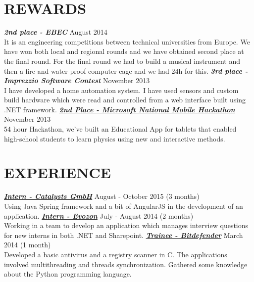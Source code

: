 \documentclass[line,margin]{res}
\begin{document}
\begin{resume}
\section{\color{section} REWARDS} 
\justify
{\color{headings}\large \sl \textbf{2nd place - EBEC}} {\scriptsize August 2014} \\
It is an engineering competitions between technical universities from Europe. We have won both local and regional rounds and we have obtained second place at the final round. 
For the final round we had to build a musical instrument and then a fire and water proof computer cage and we had 24h for this.
\vspace{0.2cm}
\newline
{\color{headings}\large \sl \textbf{3rd place - Imprezzio Software Contest}} {\scriptsize November 2013} \\
I have developed a home automation system. I have used sensors and custom build hardware which were read and controlled from a web interface built using .NET framework.
\vspace{0.2cm}
\newline
{\color{headings}\large \sl \textbf{\href{https://github.com/AlexBondor/TurnMeOff-Web}{2nd Place - Microsoft National Mobile Hackathon}}} {\scriptsize November 2013} \\
54 hour Hackathon, we've built an Educational App for tablets that enabled high-school students to learn physics using new and interactive methods.

\section{\color{section} EXPERIENCE}
\justify
{\color{headings}\large \sl \textbf{\href{https://www.catalysts.cc/en/}{Intern - Catalysts GmbH}}} {\scriptsize August - October 2015 (3 months)} \\
Using Java Spring framework and a bit of AngularJS in the development of an application.
\vspace{0.2cm}
\newline
{\color{headings}\large \sl \textbf{\href{https://www.evozon.com/}{Intern - Evozon}}} {\scriptsize July - August 2014 (2 months)} \\
Working in a team to develop an application which manages interview questions for new interns in both .NET and Sharepoint.
\vspace{0.2cm}
\newline
{\color{headings}\large \sl \textbf{\href{http://www.bitdefender.ro/}{Trainee - Bitdefender}}} {\scriptsize March 2014 (1 month)} \\
Developed a basic antivirus and a registry scanner in C. The applications involved multithreading and threads synchronization. Gathered some knowledge about the Python programming language.


\end{resume}
\end{document}
